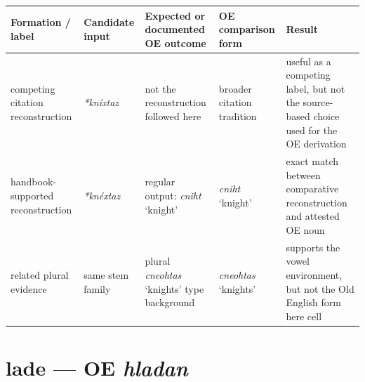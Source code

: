 \documentclass[
  british,
  a4paper,
  openany]{book}
\newcounter{none} %
\providecommand{\texorpdfstring}[2]{#1}
\begin{document}
{\def\LTcaptype{none} %
\begin{longtable}[]{@{}
  >{\raggedright\arraybackslash}p{}
  >{\raggedright\arraybackslash}p{}
  >{\raggedright\arraybackslash}p{}
  >{\raggedright\arraybackslash}p{}
  >{\raggedright\arraybackslash}p{}@{}}
\toprule\noalign{}
\begin{minipage}[b]{\linewidth}\raggedright
Formation / label
\end{minipage} & \begin{minipage}[b]{\linewidth}\raggedright
Candidate input
\end{minipage} & \begin{minipage}[b]{\linewidth}\raggedright
Expected or documented OE outcome
\end{minipage} & \begin{minipage}[b]{\linewidth}\raggedright
OE comparison form
\end{minipage} & \begin{minipage}[b]{\linewidth}\raggedright
Result
\end{minipage} \\
\midrule\noalign{}
\endhead
\bottomrule\noalign{}
\endlastfoot
competing citation reconstruction & {\emph{*kníxtaz}} & not the
reconstruction followed here & broader citation tradition & useful as a
competing label, but not the source-based choice used for the OE
derivation \\
handbook-supported reconstruction & {\emph{*knéxtaz}} & regular output:
{\emph{cniht}} `knight' & {\emph{cniht}} `knight' & exact match between
comparative reconstruction and attested OE noun \\
related plural evidence & same stem family & plural {\emph{cneohtas}}
`knights' type background & {\emph{cneohtas}} `knights' & supports the
vowel environment, but not the Old English form here cell \\
\end{longtable}
}

\section{\texorpdfstring{lade --- OE
\emph{hladan}}{lade --- OE hladan}}\label{lade-oe-hladan}

\end{document}
